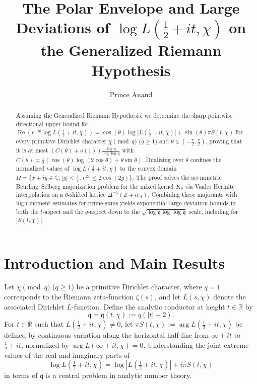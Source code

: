 \documentclass[11pt,a4paper]{amsart}
\title[Polar Envelope and Large Deviations of $\log L(\frac{1}{2}+it,\chi)$]{The Polar Envelope and Large Deviations of $\log L(\frac{1}{2}+it,\chi)$ on the Generalized Riemann Hypothesis}
\author{Prince Anand}
\theoremstyle{remark}
\numberwithin{equation}{section}
\newcommand{\R}{\mathbb{R}}
\newcommand{\C}{\mathbb{C}}
\newcommand{\Z}{\mathbb{Z}}
\newcommand{\q}{\mathfrak{q}}
\begin{document}
\begin{abstract}
Assuming the Generalized Riemann Hypothesis, we determine the sharp pointwise directional upper bound for $\operatorname{Re}(e^{-i\theta}\log L(\frac{1}{2}+it,\chi)) = \cos(\theta)\log|L(\frac{1}{2}+it,\chi)| + \sin(\theta)\pi S(t,\chi)$ for every primitive Dirichlet character $\chi \pmod q$ ($q \ge 1$) and $\theta \in (-\frac{\pi}{2},\frac{\pi}{2})$, proving that it is at most $(C(\theta)+o(1))\frac{\log\q}{\log\log\q}$ with $C(\theta)=\frac{1}{2}(\cos(\theta)\log(2\cos\theta)+\theta\sin\theta)$. Dualizing over $\theta$ confines the normalized values of $\log L(\frac{1}{2}+it,\chi)$ to the convex domain $\Omega = \{x+iy \in \C : |y|<\frac{\pi}{4},\, e^{2x} \le 2\cos(2y)\}$. The proof solves the asymmetric Beurling--Selberg majorization problem for the mixed kernel $K_\theta$ via Vaaler Hermite interpolation on a $\theta$-shifted lattice $\Delta^{-1}(\Z+\alpha_\Delta)$. Combining these majorants with high-moment estimates for prime sums yields exponential large-deviation bounds in both the $t$-aspect and the $q$-aspect down to the $\sqrt{\log\q\log\log\q}$ scale, including for $|S(t,\chi)|$.
\end{abstract}

\maketitle

\section{Introduction and Main Results}

Let $\chi \pmod q$ ($q \ge 1$) be a primitive Dirichlet character, where $q = 1$ corresponds to the Riemann zeta-function $\zeta(s)$, and let $L(s,\chi)$ denote the associated Dirichlet $L$-function. Define the analytic conductor at height $t \in \R$ by
\[
  \q = \q(t,\chi) := q(|t|+2).
\]
For $t \in \R$ such that $L(\frac{1}{2}+it,\chi) \neq 0$, let $\pi S(t,\chi) := \arg L(\frac{1}{2}+it,\chi)$ be defined by continuous variation along the horizontal half-line from $\infty+it$ to $\frac{1}{2}+it$, normalized by $\arg L(\infty+it,\chi) = 0$. Understanding the joint extreme values of the real and imaginary parts of
\[
  \log L(\tfrac{1}{2}+it,\chi) = \log|L(\tfrac{1}{2}+it,\chi)| + i\pi S(t,\chi)
\]
in terms of $\q$ is a central problem in analytic number theory.
\end{document}
